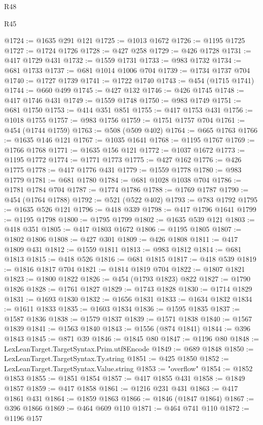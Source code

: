 \begin{lexlean}{R48}
\begin{lexlean}{R45}
\begin{coremodule}
{{{{{{{{{{{{{{{{{{{{{{{{{{{{{{{{{{{{{{{{{{{{{{{{{{{{{{{{{{{{{{{{{{{{{{{{{{{{{{{{{{{{{{{{{{{@1724 := @1635 @291 @121
@1725 := @1013 @1672
@1726 := @1195 @1725
@1727 := @1724 @1726
@1728 := @427 @258
@1729 := @426 @1728
@1731 := @417 @1729 @431
@1732 := @1559 @1731
@1733 := @983 @1732
@1734 := @681 @1733
@1737 := @681 @1014 @1006 @704
@1739 := @1734 @1737 @704
@1740 := @1727 @1739
@1741 := @1722 @1740
@1743 := @454 (@1715 @1741)
@1744 := @660 @499
@1745 := @427 @132
@1746 := @426 @1745
@1748 := @417 @1746 @431
@1749 := @1559 @1748
@1750 := @983 @1749
@1751 := @681 @1750
@1753 := @414 @351 @851
@1755 := @417 @1753 @431
@1756 := @1018 @1755
@1757 := @983 @1756
@1759 := @1751 @1757 @704
@1761 := @454 (@1744 @1759)
@1763 := @508 (@509 @402)
@1764 := @665 @1763
@1766 := @1635 @146 @121
@1767 := @1035 @1641
@1768 := @1195 @1767
@1769 := @1766 @1768
@1771 := @1635 @156 @121
@1772 := @1037 @1672
@1773 := @1195 @1772
@1774 := @1771 @1773
@1775 := @427 @162
@1776 := @426 @1775
@1778 := @417 @1776 @431
@1779 := @1559 @1778
@1780 := @983 @1779
@1781 := @681 @1780
@1784 := @681 @1028 @1038 @704
@1786 := @1781 @1784 @704
@1787 := @1774 @1786
@1788 := @1769 @1787
@1790 := @454 (@1764 @1788)
@1792 := @521 (@522 @402)
@1793 := @783 @1792
@1795 := @1635 @526 @121
@1796 := @418 @339
@1798 := @417 @1796 @1641
@1799 := @1195 @1798
@1800 := @1795 @1799
@1802 := @1635 @539 @121
@1803 := @418 @351
@1805 := @417 @1803 @1672
@1806 := @1195 @1805
@1807 := @1802 @1806
@1808 := @427 @301
@1809 := @426 @1808
@1811 := @417 @1809 @431
@1812 := @1559 @1811
@1813 := @983 @1812
@1814 := @681 @1813
@1815 := @418 @526
@1816 := @681 @1815
@1817 := @418 @539
@1819 := @1816 @1817 @704
@1821 := @1814 @1819 @704
@1822 := @1807 @1821
@1823 := @1800 @1822
@1826 := @454 (@1793 @1823) @822
@1827 := @1790 @1826
@1828 := @1761 @1827
@1829 := @1743 @1828
@1830 := @1714 @1829
@1831 := @1693 @1830
@1832 := @1656 @1831
@1833 := @1634 @1832
@1834 := @1611 @1833
@1835 := @1603 @1834
@1836 := @1595 @1835
@1837 := @1587 @1836
@1838 := @1579 @1837
@1839 := @1571 @1838
@1840 := @1567 @1839
@1841 := @1563 @1840
@1843 := @1556 (@874 @1841)
@1844 := @396 @1843
@1845 := @871 @39
@1846 := @1845 @80
@1847 := @1196 @80
@1848 := LexLeanTarget.TargetSyntax.Prim.utf8Encode
@1849 := @689 @1848
@1850 := LexLeanTarget.TargetSyntax.Ty.string
@1851 := @425 @1850
@1852 := LexLeanTarget.TargetSyntax.Value.string
@1853 := "overflow"
@1854 := @1852 @1853
@1855 := @1851 @1854
@1857 := @417 @1855 @431
@1858 := @1849 @1857
@1859 := @417 @1858
@1861 := @1216 @231 @431
@1863 := @417 @1861 @431
@1864 := @1859 @1863
@1866 := @1846 (@1847 @1864)
@1867 := @396 @1866
@1869 := @464 @609 @110
@1871 := @464 @741 @110
@1872 := @1196 @157
}}}}}}}}}}}}}}}}}}}}}}}}}}}}}}}}}}}}}}}}}}}}}}}}}}}}}}}}}}}}}}}}}}}}}}}}}}}}}}}}}}}}}}}}}}}
\end{coremodule}
\end{lexlean}
\end{lexlean}
